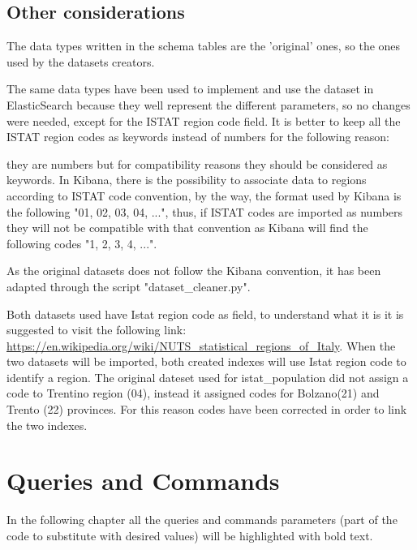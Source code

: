 \documentclass{article}
\begin{document}
\subsection{Other considerations}
The data types written in the schema tables are the 'original' ones, so the ones used by the datasets creators. 

The same data types have been used to implement and use the dataset in ElasticSearch because they well represent the different parameters, so no changes were needed, except for the ISTAT region code field.
It is better to keep all the ISTAT region codes as keywords instead of numbers for the following reason:

they are numbers but for compatibility reasons they should be considered as keywords. In Kibana, there is the possibility to associate data to regions according to ISTAT code convention, by the way, the format used by Kibana is the following "01, 02, 03, 04, ...", thus, if ISTAT codes are imported as numbers they will not be compatible with that convention as Kibana will find the following codes "1, 2, 3, 4, ...".

As the original datasets does not follow the Kibana convention, it has been adapted through the script {\selectfont"dataset\_cleaner.py"}.

\hfill\break
Both datasets used have Istat region code as field, to understand what it is it is suggested to visit the following link: \\ \url{https://en.wikipedia.org/wiki/NUTS\_statistical\_regions\_of\_Italy}.
\hfill\break
\hfill\break
When the two datasets will be imported, both created indexes will use Istat region code to identify a region. The original dateset used for istat\_population did not assign a code to Trentino region (04), instead it assigned codes for Bolzano(21) and Trento (22) provinces. For this reason codes have been corrected in order to link the two indexes.


\newpage
\section{Queries and Commands}
In the following chapter all the queries and commands parameters (part of the code to substitute with desired values) will be highlighted with {\color{magenta}{magenta}} bold text.
\end{document}

